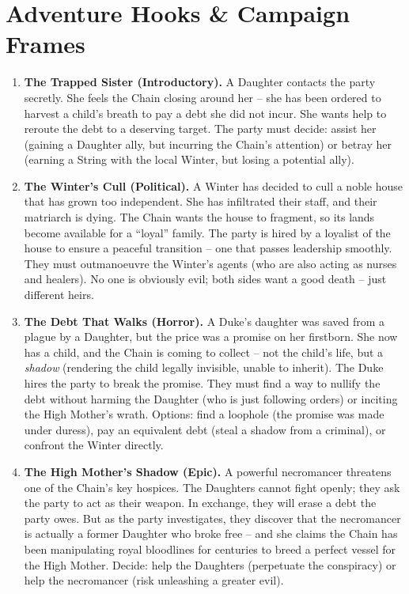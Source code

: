 \documentclass[10pt,twoside]{book}
\begin{document}
\chapter{Adventure Hooks & Campaign Frames}
\begin{enumerate}
\item \textbf{The Trapped Sister (Introductory).} A Daughter contacts the party secretly. She feels the Chain closing around her – she has been ordered to harvest a child's breath to pay a debt she did not incur. She wants help to reroute the debt to a deserving target. The party must decide: assist her (gaining a Daughter ally, but incurring the Chain's attention) or betray her (earning a String with the local Winter, but losing a potential ally).

\item \textbf{The Winter's Cull (Political).} A Winter has decided to cull a noble house that has grown too independent. She has infiltrated their staff, and their matriarch is dying. The Chain wants the house to fragment, so its lands become available for a “loyal” family. The party is hired by a loyalist of the house to ensure a peaceful transition – one that passes leadership smoothly. They must outmanoeuvre the Winter's agents (who are also acting as nurses and healers). No one is obviously evil; both sides want a good death – just different heirs.

\item \textbf{The Debt That Walks (Horror).} A Duke's daughter was saved from a plague by a Daughter, but the price was a promise on her firstborn. She now has a child, and the Chain is coming to collect – not the child's life, but a \textit{shadow} (rendering the child legally invisible, unable to inherit). The Duke hires the party to break the promise. They must find a way to nullify the debt without harming the Daughter (who is just following orders) or inciting the High Mother's wrath. Options: find a loophole (the promise was made under duress), pay an equivalent debt (steal a shadow from a criminal), or confront the Winter directly.

\item \textbf{The High Mother's Shadow (Epic).} A powerful necromancer threatens one of the Chain's key hospices. The Daughters cannot fight openly; they ask the party to act as their weapon. In exchange, they will erase a debt the party owes. But as the party investigates, they discover that the necromancer is actually a former Daughter who broke free – and she claims the Chain has been manipulating royal bloodlines for centuries to breed a perfect vessel for the High Mother. Decide: help the Daughters (perpetuate the conspiracy) or help the necromancer (risk unleashing a greater evil).


\end{enumerate}
\end{document}
